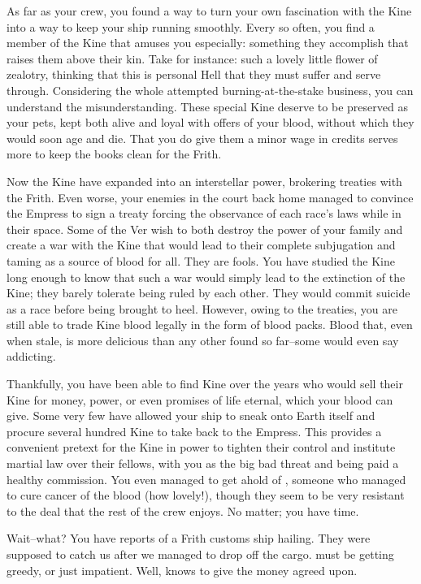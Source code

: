 \documentclass[char]{guildcamp4}
\begin{document}
As far as your crew, you found a way to turn your own fascination with the Kine into a way to keep your ship running smoothly. Every so often, you find a member of the Kine that amuses you especially: something they accomplish that raises them above their kin. Take \cJoan{} for instance: such a lovely little flower of zealotry, thinking that this is \cJoan{\their} personal Hell that they must suffer and serve through. Considering the whole attempted burning-at-the-stake business, you can understand the misunderstanding. These special Kine deserve to be preserved as your pets, kept both alive and loyal with offers of your blood, without which they would soon age and die. That you do give them a minor wage in credits serves more to keep the books clean for the Frith.

Now the Kine have expanded into an interstellar power, brokering treaties with the Frith. Even worse, your enemies in the court back home managed to convince the Empress to sign a treaty forcing the observance of each race's laws while in their space. Some of the Ver wish to both destroy the power of your family and create a war with the Kine that would lead to their complete subjugation and taming as a source of blood for all. They are fools. You have studied the Kine long enough to know that such a war would simply lead to the extinction of the Kine; they barely tolerate being ruled by each other. They would commit suicide as a race before being brought to heel. However, owing to the treaties, you are still able to trade Kine blood legally in the form of blood packs. Blood that, even when stale, is more delicious than any other found so far--some would even say addicting. 

Thankfully, you have been able to find Kine over the years who would sell their Kine for money, power, or even promises of life eternal, which your blood can give. Some very few have allowed your ship to sneak onto Earth itself and procure several hundred Kine to take back to the Empress. This provides a convenient pretext for the Kine in power to tighten their control and institute martial law over their fellows, with you as the big bad threat and being paid a healthy commission. You even managed to get ahold of \cSpite{}, someone who managed to cure cancer of the blood (how lovely!), though they seem to be very resistant to the deal that the rest of the crew enjoys. No matter; you have time.

Wait--what? You have reports of a Frith customs ship hailing. They were supposed to catch us after we managed to drop off the cargo. \cCbad{} must be getting greedy, or just impatient. Well, \cVtwo{} knows to give \cCbad{\them} the money agreed upon.
\end{document}
